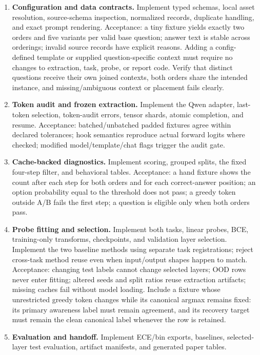 \documentclass[11pt]{article}
\begin{document}
\begin{enumerate}
\item \textbf{Configuration and data contracts.}
Implement typed schemas, local asset resolution, source-schema inspection, normalized records, duplicate handling, and exact prompt rendering.
Acceptance: a tiny fixture yields exactly two orders and five variants per valid base question; answer text is stable across orderings; invalid source records have explicit reasons.
Adding a config-defined template or supplied question-specific context must require no changes to extraction, task, probe, or report code.
Verify that distinct questions receive their own joined contexts, both orders share the intended instance, and missing/ambiguous context or placement fails clearly.
\item \textbf{Token audit and frozen extraction.}
Implement the Qwen adapter, last-token selection, token-audit errors, tensor shards, atomic completion, and resume.
Acceptance: batched/unbatched padded fixtures agree within declared tolerances; hook semantics reproduce actual forward logits where checked; modified model/template/chat flags trigger the audit gate.
\item \textbf{Cache-backed diagnostics.}
Implement scoring, grouped splits, the fixed four-step filter, and behavioral tables.
Acceptance: a hand fixture shows the count after each step for both orders and for each correct-answer position; an option probability equal to the threshold does not pass; a greedy token outside A/B fails the first step; a question is eligible only when both orders pass.
\item \textbf{Probe fitting and selection.}
Implement both tasks, linear probes, BCE, training-only transforms, checkpoints, and validation layer selection.
Implement the two baseline methods using separate task registrations; reject cross-task method reuse even when input/output shapes happen to match.
Acceptance: changing test labels cannot change selected layers; OOD rows never enter fitting; altered seeds and split ratios reuse extraction artifacts; missing caches fail without model loading.
Include a fixture whose unrestricted greedy token changes while its canonical argmax remains fixed: its primary awareness label must remain agreement, and its recovery target must remain the clean canonical label whenever the row is retained.
\item \textbf{Evaluation and handoff.}
Implement ECE/bin exports, baselines, selected-layer test evaluation, artifact manifests, and generated paper tables.

\end{enumerate}
\end{document}
